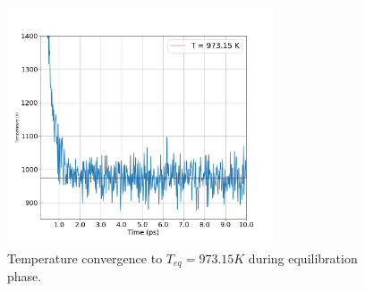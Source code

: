 \begin{figure}[!htbp]
	\begin{center}
		\includegraphics[width=0.7\textwidth]{figs/task4-temp.png} 
		\caption{Temperature convergence to $T_{eq} = 973.15K$ during equilibration phase.}
		\label{fig4-2}
	\end{center}
\end{figure}

